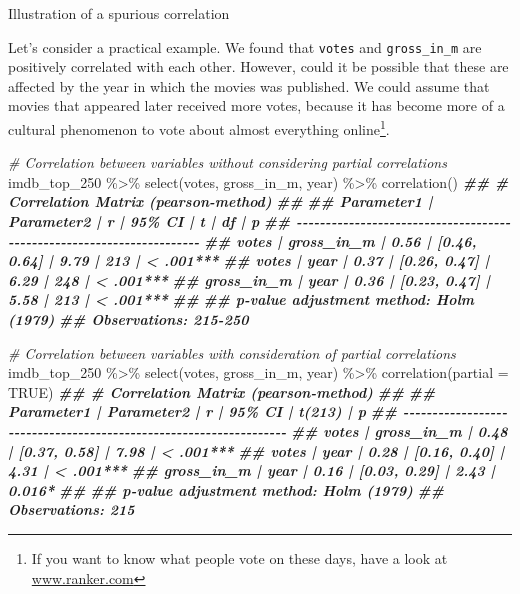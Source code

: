 \documentclass[
]{book}
\newenvironment{Shaded}{\begin{snugshade}}{\end{snugshade}}
\newcommand{\AttributeTok}[1]{\textcolor[rgb]{0.77,0.63,0.00}{#1}}
\newcommand{\CommentTok}[1]{\textcolor[rgb]{0.56,0.35,0.01}{\textit{#1}}}
\newcommand{\ConstantTok}[1]{\textcolor[rgb]{0.00,0.00,0.00}{#1}}
\newcommand{\DocumentationTok}[1]{\textcolor[rgb]{0.56,0.35,0.01}{\textbf{\textit{#1}}}}
\newcommand{\FunctionTok}[1]{\textcolor[rgb]{0.00,0.00,0.00}{#1}}
\newcommand{\NormalTok}[1]{#1}
\newcommand{\SpecialCharTok}[1]{\textcolor[rgb]{0.00,0.00,0.00}{#1}}
\begin{document}
\label{fig:illustration-spurious-correlation}Illustration of a spurious correlation

Let's consider a practical example. We found that \texttt{votes} and \texttt{gross\_in\_m} are positively correlated with each other. However, could it be possible that these are affected by the year in which the movies was published. We could assume that movies that appeared later received more votes, because it has become more of a cultural phenomenon to vote about almost everything online\footnote{If you want to know what people vote on these days, have a look at \href{https://www.ranker.com}{www.ranker.com}}.

\begin{Shaded}
\begin{Highlighting}[]
\CommentTok{\# Correlation between variables without considering partial correlations}
\NormalTok{imdb\_top\_250 }\SpecialCharTok{\%\textgreater{}\%} 
  \FunctionTok{select}\NormalTok{(votes, gross\_in\_m, year) }\SpecialCharTok{\%\textgreater{}\%} 
  \FunctionTok{correlation}\NormalTok{()}
\DocumentationTok{\#\# \# Correlation Matrix (pearson{-}method)}
\DocumentationTok{\#\# }
\DocumentationTok{\#\# Parameter1 | Parameter2 |    r |       95\% CI |    t |  df |         p}
\DocumentationTok{\#\# {-}{-}{-}{-}{-}{-}{-}{-}{-}{-}{-}{-}{-}{-}{-}{-}{-}{-}{-}{-}{-}{-}{-}{-}{-}{-}{-}{-}{-}{-}{-}{-}{-}{-}{-}{-}{-}{-}{-}{-}{-}{-}{-}{-}{-}{-}{-}{-}{-}{-}{-}{-}{-}{-}{-}{-}{-}{-}{-}{-}{-}{-}{-}{-}{-}{-}{-}{-}{-}{-}}
\DocumentationTok{\#\# votes      | gross\_in\_m | 0.56 | [0.46, 0.64] | 9.79 | 213 | \textless{} .001***}
\DocumentationTok{\#\# votes      |       year | 0.37 | [0.26, 0.47] | 6.29 | 248 | \textless{} .001***}
\DocumentationTok{\#\# gross\_in\_m |       year | 0.36 | [0.23, 0.47] | 5.58 | 213 | \textless{} .001***}
\DocumentationTok{\#\# }
\DocumentationTok{\#\# p{-}value adjustment method: Holm (1979)}
\DocumentationTok{\#\# Observations: 215{-}250}

\CommentTok{\# Correlation between variables with consideration of partial correlations}
\NormalTok{imdb\_top\_250 }\SpecialCharTok{\%\textgreater{}\%} 
  \FunctionTok{select}\NormalTok{(votes, gross\_in\_m, year) }\SpecialCharTok{\%\textgreater{}\%} 
  \FunctionTok{correlation}\NormalTok{(}\AttributeTok{partial =} \ConstantTok{TRUE}\NormalTok{)}
\DocumentationTok{\#\# \# Correlation Matrix (pearson{-}method)}
\DocumentationTok{\#\# }
\DocumentationTok{\#\# Parameter1 | Parameter2 |    r |       95\% CI | t(213) |         p}
\DocumentationTok{\#\# {-}{-}{-}{-}{-}{-}{-}{-}{-}{-}{-}{-}{-}{-}{-}{-}{-}{-}{-}{-}{-}{-}{-}{-}{-}{-}{-}{-}{-}{-}{-}{-}{-}{-}{-}{-}{-}{-}{-}{-}{-}{-}{-}{-}{-}{-}{-}{-}{-}{-}{-}{-}{-}{-}{-}{-}{-}{-}{-}{-}{-}{-}{-}{-}{-}{-}}
\DocumentationTok{\#\# votes      | gross\_in\_m | 0.48 | [0.37, 0.58] |   7.98 | \textless{} .001***}
\DocumentationTok{\#\# votes      |       year | 0.28 | [0.16, 0.40] |   4.31 | \textless{} .001***}
\DocumentationTok{\#\# gross\_in\_m |       year | 0.16 | [0.03, 0.29] |   2.43 | 0.016*   }
\DocumentationTok{\#\# }
\DocumentationTok{\#\# p{-}value adjustment method: Holm (1979)}
\DocumentationTok{\#\# Observations: 215}
\end{Highlighting}
\end{Shaded}
\end{document}
